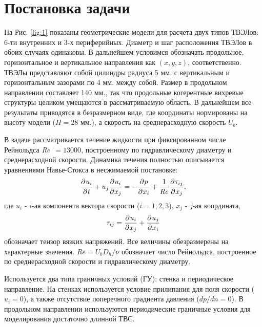 \section{Постановка задачи}\label{ch4:problem}
%
На Рис. \ref{fig:1} показаны геометрические модели для расчета двух типов ТВЭЛов: 6-ти внутренних и 3-х периферийных.
%
Диаметр и шаг расположения ТВЭЛов в обоих случаях одинаковы.
%
В дальнейшем условимся обозначать продольное, горизонтальное и вертикальное направления как $(x,y,z)$, соответственно.
%
ТВЭЛы представляют собой цилиндры радиуса 5 мм. с вертикальным и горизонтальным зазорами по 4 мм. между собой. %
Размер в продольном направлении составляет 140 мм., так что продольные когерентные вихревые структуры целиком умещаются в рассматриваемую область.
%
В дальнейшем все результаты приводятся в безразмерном виде, где координаты нормированы на высоту модели ($H=28$ мм.), а скорость на среднерасходную скорость $U_b$.
%


В задаче рассматривается течение жидкости при фиксированном числе Рейнольдса \textit{Re~}$ = 13000$, построенному по гидравлическому диаметру и среднерасходной скорости.
%
Динамика течения полностью описывается уравнениями Навье-Стокса в несжимаемой постановке:
\begin{equation}\label{n-stoks:dimen}
\pfrac{u_i}{t} + u_j \pfrac{u_i}{x_j}= - \pfrac{p}{x_i} + \frac{1}{Re} \pfrac{\tau_{ij}}{x_j},
\end{equation}
%
где $u_i$ - $i$-ая компонента вектора скорости ($i={1,2,3}$), $x_j$ - $j$-ая координата,
%
\begin{equation*}\label{stress:tensor}
\tau_{ij} = \frac{\partial\:\! u_i}{\partial\:\! x_j} + \frac{\partial\:\! u_j}{\partial\:\! x_i}
\end{equation*}
обозначает тензор вязких напряжений.
%
Все величины обезразмерены на характерные значения.
%
$Re = U_b D_h/\nu$ обозначает число Рейнольдса, построенное по среднерасходной скорости и гидравлическому диаметру.

%
Используется два типа граничных условий (ГУ): стенка и периодическое направление.
%
На стенках используется условие прилипания для поля скорости ($u_i = 0$), а также отсутствие поперечного градиента давления ($dp/dn = 0$). 
%
В продольном направлении используются периодические граничные условия для моделирования достаточно длинной ТВС.


